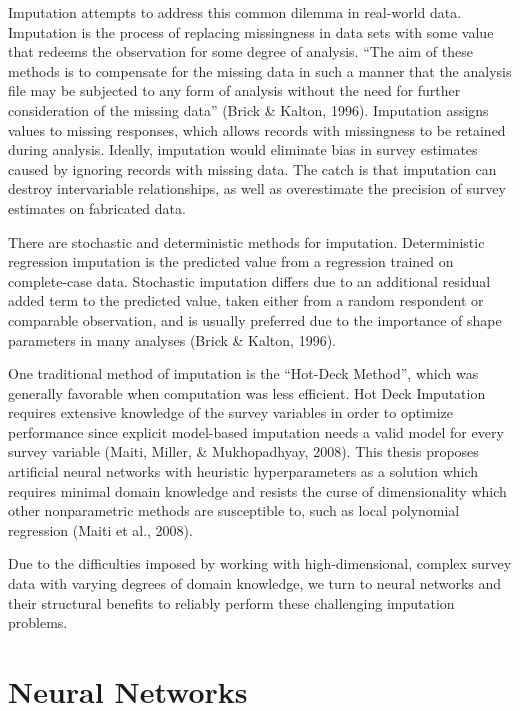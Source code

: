 \documentclass[12pt,twoside]{reedthesis}
\begin{document}
Imputation attempts to address this common dilemma in real-world data.
Imputation is the process of replacing missingness in data sets with
some value that redeems the observation for some degree of analysis.
``The aim of these methods is to compensate for the missing data in such
a manner that the analysis file may be subjected to any form of analysis
without the need for further consideration of the missing data'' (Brick
\& Kalton, 1996). Imputation assigns values to missing responses, which
allows records with missingness to be retained during analysis. Ideally,
imputation would eliminate bias in survey estimates caused by ignoring
records with missing data. The catch is that imputation can destroy
intervariable relationships, as well as overestimate the precision of
survey estimates on fabricated data.

There are stochastic and deterministic methods for imputation.
Deterministic regression imputation is the predicted value from a
regression trained on complete-case data. Stochastic imputation differs
due to an additional residual added term to the predicted value, taken
either from a random respondent or comparable observation, and is
usually preferred due to the importance of shape parameters in many
analyses (Brick \& Kalton, 1996).

One traditional method of imputation is the ``Hot-Deck Method'', which
was generally favorable when computation was less efficient. Hot Deck
Imputation requires extensive knowledge of the survey variables in order
to optimize performance since explicit model-based imputation needs a
valid model for every survey variable (Maiti, Miller, \& Mukhopadhyay,
2008). This thesis proposes artificial neural networks with heuristic
hyperparameters as a solution which requires minimal domain knowledge
and resists the curse of dimensionality which other nonparametric
methods are susceptible to, such as local polynomial regression (Maiti
et al., 2008).

Due to the difficulties imposed by working with high-dimensional,
complex survey data with varying degrees of domain knowledge, we turn to
neural networks and their structural benefits to reliably perform these
challenging imputation problems.

\chapter{Neural Networks}\label{math-sci}
\end{document}
